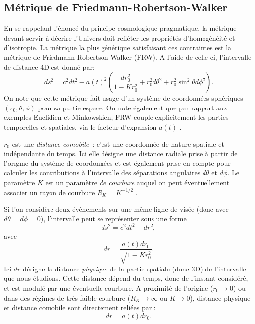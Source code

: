 \subsection{Métrique de Friedmann-Robertson-Walker}
En se rappelant l'énoncé du principe cosmologique pragmatique, la métrique devant servir à décrire l'Univers doit refléter les propriétés d'homogénéité et d'isotropie. La métrique la plus générique satisfaisant ces contraintes est la métrique de Friedmann-Robertson-Walker (FRW). A l'aide de celle-ci, l'intervalle de distance 4D est donné par:
\begin{equation}
ds^2=c^2dt^2-a(t)^2(\frac{dr_0^2}{1-Kr_0^2}+r_0^2d\theta^2+r_0^2\sin^2\theta d\phi^2).
\label{e:FRW}
\end{equation}
On note que cette métrique fait usage d'un système de coordonnées sphériques $(r_0,\theta,\phi)$ pour sa partie espace. On note également que par rapport aux exemples Euclidien et Minkowskien, FRW couple explicitement les parties temporelles et spatiales, via le facteur d'expansion  $a(t)$ .  

$r_0$ est une \textit{distance comobile}~: c'est une coordonnée de nature spatiale et indépendante du temps. Ici elle désigne une distance radiale prise à partir de l'origine du système de coordonnées et est également prise en compte pour calculer les contributions à l'intervalle des séparations angulaires $d\theta$ et $d\phi$. Le paramètre $K$ est un paramètre \textit{de courbure} auquel on peut éventuellement associer un rayon de courbure $R_K=K^{-1/2}$ .

Si l'on considère deux évènements sur une même ligne de visée (donc avec $d\theta=d\phi=0$), l'intervalle peut se représenter sous une forme
\begin{equation}
ds^2=c^2dt^2-dr^2,
\end{equation}
avec 
\begin{equation}
dr=\frac{a(t)dr_0}{\sqrt{1-Kr_0^2}}.
\label{e:phydist}
\end{equation}
Ici $dr$ désigne la distance \textit{physique} de la partie spatiale (donc 3D) de l'intervalle que nous étudions. Cette distance dépend du temps, donc de l'instant considéré, et est modulé par une éventuelle courbure. A proximité de l'origine ($r_0\rightarrow 0$) ou dans des régimes de très faible courbure ($R_K\rightarrow\infty$ ou $K\rightarrow 0$), distance physique et distance comobile sont directement reliées par :
\begin{equation}
dr=a(t)dr_0.
\end{equation}

